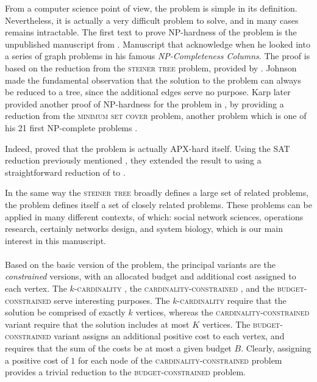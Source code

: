 	From a computer science point of view, the \mwcs{} problem is simple in its definition.
	Nevertheless, it is actually a very difficult problem to solve, and in many cases remains intractable.
	The first text to prove NP-hardness of the problem is the unpublished manuscript from \textcite{vergis1983manuscript}.
	Manuscript that \textcite[Section 5]{johnson1985np} acknowledge when he looked into a series of graph problems in his famous \emph{NP-Completeness Columns}.
	The proof is based on the reduction from the \textsc{steiner tree} problem, provided by \textcite{garey1979computers}.
	Johnson made the fundamental observation that the solution to the \mwcs{} problem can always be reduced to a tree, since the additional edges serve no purpose.
	Karp later provided another proof of NP-hardness for the \mwcs{} problem in \parencite[Supplementary Material]{ideker2002discovering}, by providing a reduction from the \textsc{minimum set cover} problem, another problem which is one of his 21 first NP-complete problems \parencite{karp1972reducibility}.


	Indeed, \textcite{alvarez2013maximum} proved that the \mwcs{} problem is actually APX-hard itself.
	Using the SAT reduction previously mentioned \parencite{feigenbaum2000sharing}, they extended the result to \mwcs{} using a straightforward reduction of \pcst{} to \mwcs{}.

	In the same way the \textsc{steiner tree} broadly defines a large set of related problems, the \mwcs{} problem defines itself a set of closely related problems.
	These problems can be applied in many different contexts, of which: social network sciences, operations research, certainly networks design, and system biology, which is our main interest in this manuscript.

	\paragraph{}
	Based on the basic version of the \mwcs{} problem, the principal variants are the \emph{constrained} versions, with an allocated budget and additional cost assigned to each vertex.
	The \textsc{$k$-cardinality \mwcs{}}, the \textsc{cardinality-constrained \mwcs{}}, and the \textsc{budget-constrained \mwcs{}} serve interesting purposes.
	The \textsc{$k$-cardinality \mwcs{}} require that the solution be comprised of exactly $k$ vertices, whereas the \textsc{cardinality-constrained \mwcs{}} variant require that the solution includes at most $K$ vertices.
	The \textsc{budget-constrained \mwcs{}} variant assigns an additional positive cost to each vertex, and requires that the sum of the costs be at most a given budget $B$.
	Clearly, assigning a positive cost of $1$ for each node of the \textsc{cardinality-constrained \mwcs{}} problem provides a trivial reduction to the \textsc{budget-constrained \mwcs{}} problem.


